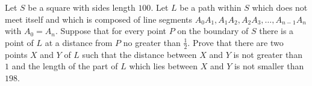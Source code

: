 Let $S$ be a square with sides length $100$. Let $L$ be a path within $S$ which does not meet itself and which is composed of line segments $A_0A_1,A_1A_2,A_2A_3,\ldots,A_{n-1}A_n$ with $A_0=A_n$. Suppose that for every point $P$ on the boundary of $S$ there is a point of $L$ at a distance from $P$ no greater than $\frac {1} {2}$. Prove that there are two points $X$ and $Y$ of $L$ such that the distance between $X$ and $Y$ is not greater than $1$ and the length of the part of $L$ which lies between $X$ and $Y$ is not smaller than $198$.